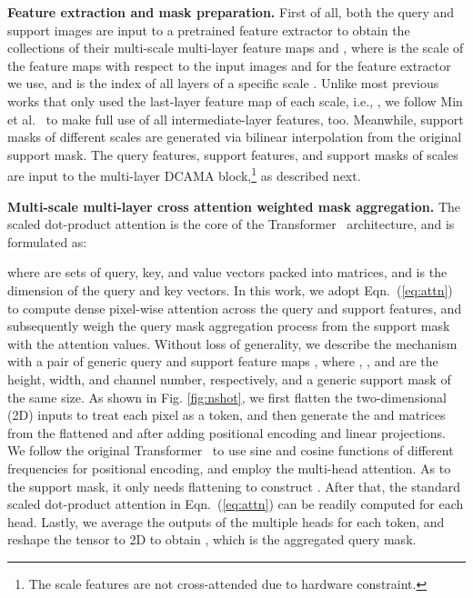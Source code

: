 \documentclass[runningheads,table,xcdraw]{llncs}
\begin{document}
\textbf{Feature extraction and mask preparation.}
First of all, both the query and support images are input to a pretrained feature extractor
to obtain the collections of their multi-scale multi-layer feature maps  and , where  is the scale of the feature maps with respect to the input images and  for the feature extractor we use, and  is the index of all layers of a specific scale .
Unlike most previous works that only used the last-layer feature map of each scale, i.e., , we follow Min et al.~\cite{min2021hypercorrelation} to make full use of all intermediate-layer features, too.
Meanwhile, support masks of different scales 
are generated via bilinear interpolation from the original support mask.
The query features, support features, and support masks of scales  are input to the multi-layer DCAMA block,\footnote{The  scale features are not cross-attended due to hardware constraint.}
as described next.

\textbf{Multi-scale multi-layer cross attention weighted mask aggregation.}\label{subsec:mha}
The scaled dot-product attention is the core of the Transformer~\cite{vaswani2017attention} architecture, and is formulated as:\vspace{-2.75mm}

where  are sets of query, key, and value vectors packed into matrices, and  is the dimension of the query and key vectors.
In this work, we adopt Eqn.~(\ref{eq:attn}) to compute dense pixel-wise attention across the query and support features, and subsequently weigh the query mask aggregation process from the support mask with the attention values.
Without loss of generality, we describe the mechanism with a pair of generic query and support feature maps , where , , and  are the height, width, and channel number, respectively, and a generic support mask  of the same size.
As shown in Fig. \ref{fig:nshot},
we first flatten the two-dimensional (2D) inputs
to treat each pixel as a token, and then generate the  and  matrices from the flattened  and  after adding positional encoding and linear projections.
We follow the original Transformer~\cite{vaswani2017attention} to use sine and cosine functions of different frequencies for positional encoding, and employ the multi-head attention.
As to the support mask, it only needs flattening to construct .
After that, the standard scaled dot-product attention in Eqn.~(\ref{eq:attn}) can be readily computed for each head.
Lastly, we average the outputs of the multiple heads for each token, and reshape the tensor to 2D to obtain , which is the aggregated query mask.
\end{document}
